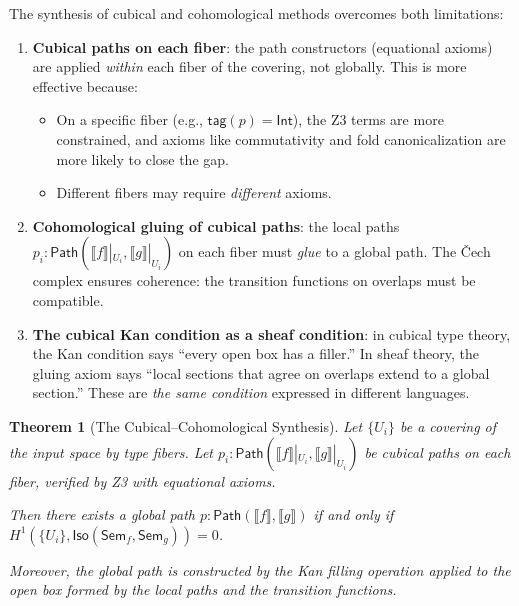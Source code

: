 \documentclass[11pt,a4paper]{report}
\theoremstyle{definition}
\theoremstyle{plain}
\newtheorem{theorem}[definition]{Theorem}
\newcommand{\den}[1]{\llbracket #1 \rrbracket}
\newcommand{\Path}{\mathsf{Path}}
\newcommand{\Sem}{\mathsf{Sem}}
\newcommand{\Iso}{\mathsf{Iso}}
\newcommand{\Hone}{H^1}
\begin{document}
The synthesis of cubical and cohomological methods overcomes both
limitations:

\begin{enumerate}
  \item \textbf{Cubical paths on each fiber}: the path constructors
    (equational axioms) are applied \emph{within} each fiber of the
    covering, not globally.  This is more effective because:
    \begin{itemize}
      \item On a specific fiber (e.g., $\mathsf{tag}(p) = \mathsf{Int}$),
        the Z3 terms are more constrained, and axioms like commutativity
        and fold canonicalization are more likely to close the gap.
      \item Different fibers may require \emph{different} axioms.
    \end{itemize}

  \item \textbf{Cohomological gluing of cubical paths}: the local paths
    $p_i : \Path(\den{f}|_{U_i}, \den{g}|_{U_i})$ on each fiber must
    \emph{glue} to a global path.  The \v{C}ech complex ensures
    coherence: the transition functions on overlaps must be compatible.

  \item \textbf{The cubical Kan condition as a sheaf condition}: in
    cubical type theory, the Kan condition says ``every open box has a
    filler.''  In sheaf theory, the gluing axiom says ``local sections
    that agree on overlaps extend to a global section.''  These are
    \emph{the same condition} expressed in different languages.
\end{enumerate}

\begin{theorem}[The Cubical--Cohomological Synthesis]
\label{thm:synthesis}
Let $\{U_i\}$ be a covering of the input space by type fibers.
Let $p_i : \Path(\den{f}|_{U_i}, \den{g}|_{U_i})$ be cubical paths
on each fiber, verified by Z3 with equational axioms.

Then there exists a global path $p : \Path(\den{f}, \den{g})$
if and only if $\Hone(\{U_i\}, \Iso(\Sem_f, \Sem_g)) = 0$.

Moreover, the global path is constructed by the Kan filling operation
applied to the open box formed by the local paths and the transition
functions.
\end{theorem}
\end{document}
